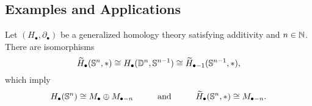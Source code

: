 	\newpage
	\subsection{Examples and Applications}

	\begin{lemma}
		Let $(H_\bullet, \partial_\bullet)$ be a generalized homology theory satisfying additivity and $n \in \mathbb{N}$. There are isomorphisms
		\begin{equation*}
			\widetilde{H}_\bullet(\mathbb{S}^n,*) \cong H_\bullet(\mathbb{D}^n,\mathbb{S}^{n-1}) \cong \widetilde{H}_{\bullet-1}(\mathbb{S}^{n-1},*),
		\end{equation*}
		which imply
		\begin{equation*}
			H_\bullet(\mathbb{S}^n) \cong M_\bullet \oplus M_{\bullet-n} \hspace{1cm}\text{and}\hspace{1cm} \widetilde{H}_\bullet(\mathbb{S}^n,*) \cong M_{\bullet-n}.
		\end{equation*}
	\end{lemma}
